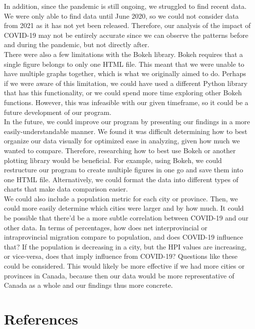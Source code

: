 \documentclass[fontsize=11pt]{article}
\begin{document}
In addition, since the pandemic is still ongoing, we struggled to find recent data. We were only able to find data until June 2020, so we could not consider data from 2021 as it has not yet been released. Therefore, our analysis of the impact of COVID-19 may not be entirely accurate since we can observe the patterns before and during the pandemic, but not directly after. \\

There were also a few limitations with the Bokeh library. Bokeh requires that a single figure belongs to only one HTML file. This meant that we were unable to have multiple graphs together, which is what we originally aimed to do. Perhaps if we were aware of this limitation, we could have used a different Python library that has this functionality, or we could spend more time exploring other Bokeh functions. However, this was infeasible with our given timeframe, so it could be a future development of our program. \\

In the future, we could improve our program by presenting our findings in a more easily-understandable manner. We found it was difficult determining how to best organize our data visually for optimized ease in analyzing, given how much we wanted to compare. Therefore, researching how to best use Bokeh or another plotting library would be beneficial. For example, using Bokeh, we could restructure our program to create multiple figures in one go and save them into one HTML file. Alternatively, we could format the data into different types of charts that make data comparison easier. \\

We could also include a population metric for each city or province. Then, we could more easily determine which cities were larger and by how much. It could be possible that there’d be a more subtle correlation between COVID-19 and our other data. In terms of percentages, how does net interprovincial or intraprovincial migration compare to population, and does COVID-19 influence that? If the population is decreasing in a city, but the HPI values are increasing, or vice-versa, does that imply influence from COVID-19? Questions like these could be considered. This would likely be more effective if we had more cities or provinces in Canada, because then our data would be more representative of Canada as a whole and our findings thus more concrete.

\newpage

\section{References}
\end{document}
